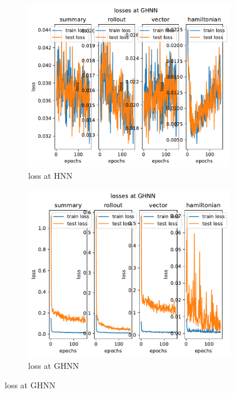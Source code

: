 \begin{figure}[H]
	\centering
	\begin{subfigure}[b]{0.3\textwidth}
		\centering
		\includegraphics[width=\textwidth]{chapters/chapter5/fignew_hnn_loss.pdf}
		\caption{loss at HNN}
	\end{subfigure}
	\hfill
	\begin{subfigure}[b]{0.3\textwidth}
		\centering
		\includegraphics[width=\textwidth]{chapters/chapter5/fignew_ghnn_loss.pdf}
		\caption{loss at GHNN}

\end{subfigure}
\end{figure}
